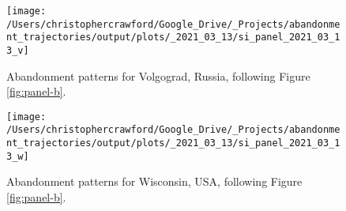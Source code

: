 \documentclass[9pt,twocolumn,twoside,lineno]{pnas-new}
\begin{document}
\begin{figure}
\texttt{[image: /Users/christophercrawford/Google\_Drive/\_Projects/abandonment\_trajectories/output/plots/\_2021\_03\_13/si\_panel\_2021\_03\_13\_v]} \caption{Abandonment patterns for Volgograd, Russia, following Figure \ref{fig:panel-b}.}\label{fig:panel-v}
\end{figure}

\begin{figure}
\texttt{[image: /Users/christophercrawford/Google\_Drive/\_Projects/abandonment\_trajectories/output/plots/\_2021\_03\_13/si\_panel\_2021\_03\_13\_w]} \caption{Abandonment patterns for Wisconsin, USA, following Figure \ref{fig:panel-b}.}\label{fig:panel-w}
\end{figure}

\pnasbreak



% 
\end{document}
